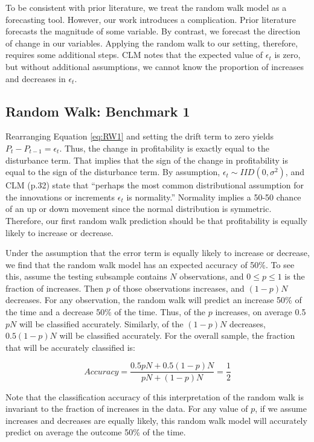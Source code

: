 To be consistent with prior literature, we treat the random walk model as a forecasting tool. However, our work introduces a complication. Prior literature forecasts the magnitude of some variable. By contrast, we forecast the direction of change in our variables. Applying the random walk to our setting, therefore, requires some additional steps. CLM notes that the expected value of \(\epsilon_t\) is zero, but without additional assumptions, we cannot know the proportion of increases and decreases in \(\epsilon_t\).

\subsection{Random Walk: Benchmark 1}

Rearranging Equation \ref{eq:RW1} and setting the drift term to zero yields \(P_t - P_{t-1} = \epsilon_t\). Thus, the change in profitability is exactly equal to the disturbance term. That implies that the sign of the change in profitability is equal to the sign of the disturbance term. By assumption,  \(\epsilon_t \sim IID(0,\sigma^2)\), and CLM (p.32) state that “perhaps the most common distributional assumption for the innovations or increments \(\epsilon_t\) is normality.” Normality implies a 50-50 chance of an up or down movement since the normal distribution is symmetric. Therefore, our first random walk prediction should be that profitability is equally likely to increase or decrease.

Under the assumption that the error term is equally likely to increase or decrease, we find that the random walk model has an expected accuracy of 50\%. To see this, assume the testing subsample contains \(N\) observations, and  \(0 \leq p \leq 1\) is the fraction of increases. Then \(p\) of those observations increases, and \((1-p)N\) decreases. For any observation, the random walk will predict an increase 50\% of the time and a decrease 50\% of the time. Thus, of the \(p\) increases, on average 0.5\(pN\) will be classified accurately.  Similarly, of the \((1-p)N\) decreases, \(0.5(1-p)N\) will be classified accurately.  For the overall sample, the fraction that will be accurately classified is:

\[Accuracy= \frac{0.5pN+0.5(1-p)N}{pN+(1-p)N}=\frac{1}{2}\]

\noindent Note that the classification accuracy of this interpretation of the random walk is invariant to the fraction of increases in the data. For any value of \(p\), if we assume increases and decreases are equally likely, this random walk model will accurately predict on average the outcome 50\% of the time.

